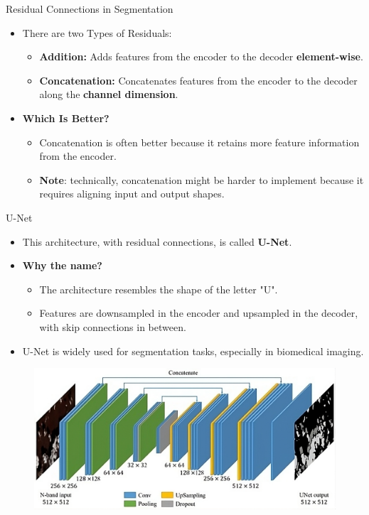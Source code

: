 \documentclass[10pt]{beamer}
\theoremstyle{remark}
\theoremstyle{definition}
\begin{document}
\begin{frame}{Residual Connections in Segmentation}
\begin{itemize}
    \item There are two Types of Residuals:
    \begin{itemize}
        \item \textbf{Addition:} Adds features from the encoder to the decoder \textbf{element-wise}.
        \item \textbf{Concatenation:} Concatenates features from the encoder to the decoder along the \textbf{channel dimension}.
    \end{itemize}
    \item \textbf{Which Is Better?}
    \begin{itemize}
        \item Concatenation is often better because it retains more feature information from the encoder.
        \item \textbf{Note}: technically, concatenation might be harder to implement because it requires aligning input and output shapes.
    \end{itemize}
\end{itemize}
\end{frame}

\begin{frame}{U-Net}
\begin{itemize}
    \item This architecture, with residual connections, is called \textbf{U-Net}.
    \item \textbf{Why the name?}
    \begin{itemize}
        \item The architecture resembles the shape of the letter "U".
        \item Features are downsampled in the encoder and upsampled in the decoder, with skip connections in between.
    \end{itemize}
    \item U-Net is widely used for segmentation tasks, especially in biomedical imaging.
\end{itemize}
\begin{figure}
    \centering
    \includegraphics[width=0.75\linewidth]{images/unet2.jpeg} 
\end{figure}
\end{frame}
\end{document}
